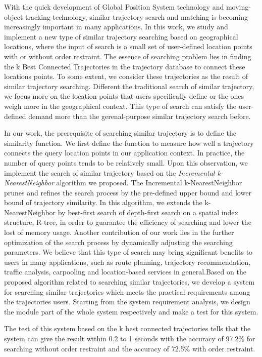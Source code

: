 \begin{englishabstract}
With the quick development of Global Position System technology and moving-object tracking technology, similar trajectory search and matching is becoming increasingly important in many applications. In this work, we study and implement a new type of similar trajectory searching based on geographical locations, where the input of search is a small set of user-defined location points with or without order restraint. The essence of searching problem lies in finding the k Best Connected Trajectories in the trajectory database to connect these locations points. To some extent, we consider these trajectories as the result of similar trajectory searching. Different the traditional search of similar trajectory, we focus more on the location points that users specifically define or the ones weigh more in the geographical context. This type of search can satisfy the user-defined demand more than the gerenal-purpose similar trajectory search before.

In our work, the prerequisite of searching similar trajectory is to define the similarity function. We first define the function to measure how well a trajectory connects the query location points in our application context. In practice, the number of query points tends to be relatively small. Upon this observation, we implement the search of similar trajectory based on the \emph{Incremental k-NearestNeighbor} algorithm we proposed. The Incremental k-NearestNeighbor prunes and refines the search process by the pre-defined upper bound and lower bound of trajectory similarity. In this algorithm, we extends the k-NearestNeighbor by best-first search of depth-first search on a spatial index structure, R-tree, in order to guarantee the efficiency of searching and lower the lost of memory usage. Another contribution of our work lies in the further optimization of the search process by dynamically adjusting the searching parameters. We believe that this type of search may bring significant benefits to users in many applications, such as route planning, trajectory recommendation, traffic analysis, carpooling and location-based services in general.Based on the proposed algorithm related to searching similar trajectories, we develop a system for searching similar trajectories which meets the practical requirements among the trajectories users. Starting from the system requirement analysis, we design the module part of the whole system respectively and make a test for this system.

The test of this system based on the k best connected trajectories tells that the system can give the result within 0.2 to 1 seconds with the accuracy of 97.2\% for searching without order restraint and the accuracy of 72.5\% with order restraint.

\end{englishabstract}

